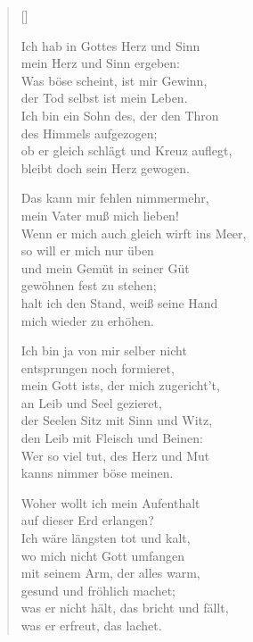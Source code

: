 \begin{multicols}{2}
\settowidth{\versewidth}{Wenn er mich auch gleich wirft ins Meer,}
\begin{verse}[\versewidth]

 Ich hab in Gottes Herz und Sinn\\
mein Herz und Sinn ergeben:\\
Was böse scheint, ist mir Gewinn,\\
der Tod selbst ist mein Leben.\\
Ich bin ein Sohn des, der den Thron\\
des Himmels aufgezogen;\\
ob er gleich schlägt und Kreuz auflegt,\\
bleibt doch sein Herz gewogen.

 Das kann mir fehlen nimmermehr,\\
mein Vater muß mich lieben!\\
Wenn er mich auch gleich wirft ins Meer,\\
so will er mich nur üben\\
und mein Gemüt in seiner Güt\\
gewöhnen fest zu stehen;\\
halt ich den Stand, weiß seine Hand\\
mich wieder zu erhöhen.

 Ich bin ja von mir selber nicht\\
entsprungen noch formieret,\\
mein Gott ists, der mich zugericht't,\\
an Leib und Seel gezieret,\\
der Seelen Sitz mit Sinn und Witz,\\
den Leib mit Fleisch und Beinen:\\
Wer so viel tut, des Herz und Mut\\
kanns nimmer böse meinen.

 Woher wollt ich mein Aufenthalt\\
auf dieser Erd erlangen?\\
Ich wäre längsten tot und kalt,\\
wo mich nicht Gott umfangen\\
mit seinem Arm, der alles warm,\\
gesund und fröhlich machet;\\
was er nicht hält, das bricht und fällt,\\
was er erfreut, das lachet.


\end{verse}
\end{multicols}
